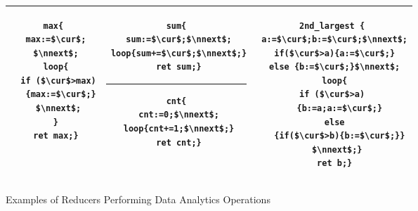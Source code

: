\begin{figure}
	\centering
	\lstset{language=C,
		basicstyle=\ttfamily\scriptsize}
	\begin{tabular}{|c|c|c|}
		\hline
		\begin{minipage}[t]{0.23\textwidth}
		\vspace{-0.5cm}
			\begin{lstlisting}[mathescape=true]
max{
 max:=$\cur$;
 $\nnext$;
 loop{
  if ($\cur$>max)
   {max:=$\cur$;}
  $\nnext$;
 }
 ret max;}
	\end{lstlisting}
		\end{minipage}&
		\begin{minipage}[t]{0.27\textwidth}
		\vspace{-0.5cm}
			\begin{lstlisting}[mathescape=true]
sum{
 sum:=$\cur$;$\nnext$;
 loop{sum+=$\cur$;$\nnext$;}
 ret sum;}
			\end{lstlisting}
\hrule\vspace{0.1cm}%
			\begin{lstlisting}[mathescape=true]
cnt{
 cnt:=0;$\nnext$;
 loop{cnt+=1;$\nnext$;}
 ret cnt;}
			\end{lstlisting}			
		\end{minipage}&
		\begin{minipage}[t]{0.30\textwidth}
		\vspace{-0.5cm}			
			\begin{lstlisting}[mathescape=true]
2nd_largest {
 a:=$\cur$;b:=$\cur$;$\nnext$;
 if($\cur$>a){a:=$\cur$;}
 else {b:=$\cur$;}$\nnext$;
 loop{
  if ($\cur$>a)  
   {b:=a;a:=$\cur$;}
  else 
   {if($\cur$>b){b:=$\cur$;}}
  $\nnext$;}
 ret b;}
			\end{lstlisting}		
		\end{minipage}\\
		\hline		
	\end{tabular}
	\caption{Examples of Reducers Performing Data Analytics Operations}
	\label{fig:examples}
\end{figure}
